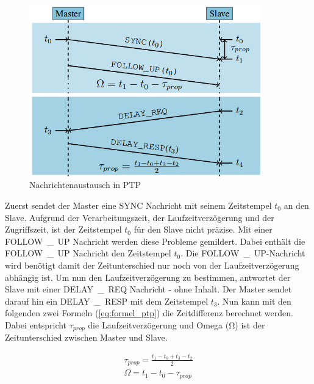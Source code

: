 \begin{figure}[H]
        \centering
        \includegraphics[width=0.9\textwidth]{images/ptp.png}
        \caption{Nachrichtenaustausch in PTP}
        \label{img:ptp}
\end{figure}

Zuerst sendet der Master eine \si{SYNC} Nachricht mit seinem Zeitstempel $t_{0}$ an den Slave. Aufgrund der Verarbeitungszeit, der Laufzeitverzögerung und der Zugriffszeit, ist der Zeitstempel $t_{0}$ für den Slave nicht präzise. Mit einer \si{FOLLOW\_UP} Nachricht werden diese Probleme gemildert. Dabei enthält die \si{FOLLOW\_UP} Nachricht den Zeitstempel $t_{0}$. Die \si{FOLLOW\_UP}-Nachricht wird benötigt damit der Zeitunterschied nur noch von der Laufzeitverzögerung abhängig ist. Um nun den Laufzeitverzögerung zu bestimmen, antwortet der Slave mit einer \si{DELAY\_REQ} Nachricht - ohne Inhalt. Der Master sendet darauf hin ein \si{DELAY\_RESP} mit dem Zeitstempel $t_{3}$. Nun kann mit den folgenden zwei Formeln (\ref{eq:formel_ptp}) die Zeitdifferenz berechnet werden. Dabei entspricht $\tau_{prop}$ die Laufzeitverzögerung und Omega (\si{\ohm}) ist der Zeitunterschied zwischen Master und Slave.

\begin{equation}\label{eq:formel_ptp}
\begin{split}
\tau_{prop} = \frac{t_{1} - t_{0} + t_{3} - t_{2}}{2}
\\
\Omega = t_{1} - t_{0} - \tau_{prop}
\end{split}
\end{equation}



